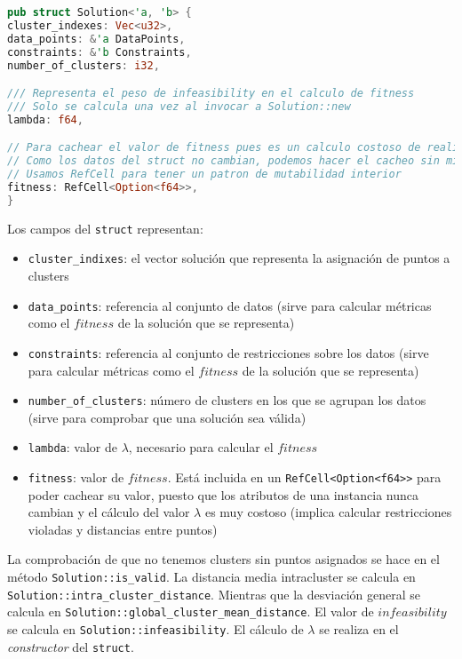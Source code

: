\documentclass[11pt]{article}
\begin{document}
\begin{lstlisting}[language=Rust, style=Boxed]
pub struct Solution<'a, 'b> {
cluster_indexes: Vec<u32>,
data_points: &'a DataPoints,
constraints: &'b Constraints,
number_of_clusters: i32,

/// Representa el peso de infeasibility en el calculo de fitness
/// Solo se calcula una vez al invocar a Solution::new
lambda: f64,

// Para cachear el valor de fitness pues es un calculo costoso de realizar
// Como los datos del struct no cambian, podemos hacer el cacheo sin miedo
// Usamos RefCell para tener un patron de mutabilidad interior
fitness: RefCell<Option<f64>>,
}
\end{lstlisting}

Los campos del \lstinline{struct} representan:

\begin{itemize}
\item \lstinline{cluster_indixes}: el vector solución que representa la asignación de puntos a clusters
\item \lstinline{data_points}: referencia al conjunto de datos (sirve para calcular métricas como el $fitness$ de la solución que se representa)
\item \lstinline{constraints}: referencia al conjunto de restricciones sobre los datos (sirve para calcular métricas como el $fitness$ de la solución que se representa)
\item \lstinline{number_of_clusters}: número de clusters en los que se agrupan los datos (sirve para comprobar que una solución sea válida)
\item \lstinline{lambda}: valor de $\lambda$, necesario para calcular el $fitness$
\item \lstinline{fitness}: valor de $fitness$. Está incluida en un \lstinline{RefCell<Option<f64>>} para poder cachear su valor, puesto que los atributos de una instancia nunca cambian y el cálculo del valor $\lambda$ es muy costoso (implica calcular restricciones violadas y distancias entre puntos)
\end{itemize}

La comprobación de que no tenemos clusters sin puntos asignados se hace en el método \lstinline{Solution::is_valid}. La distancia media intracluster se calcula en \lstinline{Solution::intra_cluster_distance}. Mientras que la desviación general se calcula en \lstinline{Solution::global_cluster_mean_distance}. El valor de $infeasibility$ se calcula en \lstinline{Solution::infeasibility}. El cálculo de $\lambda$ se realiza en el \emph{constructor} del \lstinline{struct}.
\end{document}
